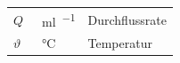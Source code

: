 \begin{table}[!h]
\begin{tabular}{p{2cm}p{2cm}p{7cm}}
        $Q$				& \qty{}{\milli\litre\per\min} & Durchflussrate\\
        $\vartheta $    & \qty{}{\degreeCelsius} & Temperatur\\
        


    \end{tabular}
    \label{tab:my_label}
\end{table}
